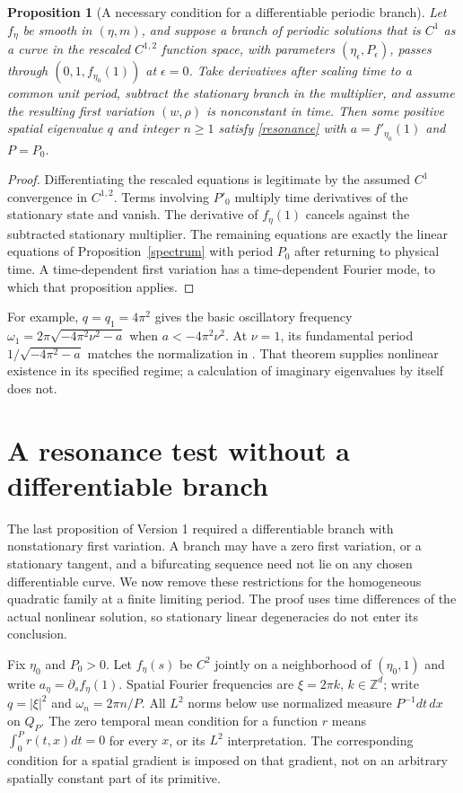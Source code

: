 \documentclass[11pt]{article}
\newtheorem{proposition}[theorem]{Proposition}
\begin{document}
\begin{proposition}[A necessary condition for a differentiable periodic branch]
Let $f_\eta$ be smooth in $(\eta,m)$, and suppose a branch of
periodic solutions that is $C^1$ as a curve in the rescaled $C^{1,2}$
function space, with parameters $(\eta_\epsilon,P_\epsilon)$,
passes through $(0,1,f_{\eta_0}(1))$ at $\epsilon=0$.
Take derivatives after scaling time to a common unit period, subtract the
stationary branch in the multiplier, and assume the resulting first
variation $(w,\rho)$ is nonconstant in time. Then some positive spatial
eigenvalue $q$ and integer $n\geq1$ satisfy \eqref{resonance} with
$a=f'_{\eta_0}(1)$ and $P=P_0$.
\end{proposition}
\begin{proof}
Differentiating the rescaled equations is legitimate by the assumed
$C^1$ convergence in $C^{1,2}$. Terms involving $P'_0$ multiply time
derivatives of the stationary state and vanish. The derivative of
$f_\eta(1)$ cancels against the subtracted stationary multiplier.
The remaining equations are exactly the linear equations of
Proposition~\ref{spectrum} with period $P_0$ after returning to physical
time. A time-dependent first variation has a time-dependent Fourier
mode, to which that proposition applies.
\end{proof}

For example, $q=q_1=4\pi^2$ gives the basic oscillatory frequency
$\omega_1=2\pi\sqrt{-4\pi^2\nu^2-a}$ when $a<-4\pi^2\nu^2$.
At $\nu=1$, its fundamental period
$1/\sqrt{-4\pi^2-a}$ matches the normalization in
\cite[Theorem 6.1]{CN}. That theorem supplies nonlinear existence in
its specified regime; a calculation of imaginary eigenvalues by itself
does not.


\section{A resonance test without a differentiable branch}
The last proposition of Version 1 required a differentiable branch with
nonstationary first variation. A branch may have a zero first variation,
or a stationary tangent, and a bifurcating sequence need not lie on any
chosen differentiable curve. We now remove these restrictions for the
homogeneous quadratic family at a finite limiting period. The proof
uses time differences of the actual nonlinear solution, so stationary
linear degeneracies do not enter its conclusion.

Fix $\eta_0$ and $P_0>0$. Let $f_\eta(s)$ be $C^2$ jointly on a
neighborhood of $(\eta_0,1)$ and write $a_\eta=\partial_s f_\eta(1)$.
Spatial Fourier frequencies are $\xi=2\pi k$, $k\in\mathbb Z^d$;
write $q=|\xi|^2$ and $\omega_n=2\pi n/P$. All $L^2$ norms below
use normalized measure $P^{-1}dt\,dx$ on $Q_P$.
The zero temporal mean condition for a function $r$ means
$\int_0^P r(t,x)dt=0$ for every $x$, or its $L^2$ interpretation.
The corresponding condition for a spatial gradient is imposed on that
gradient, not on an arbitrary spatially constant part of its primitive.
\end{document}
